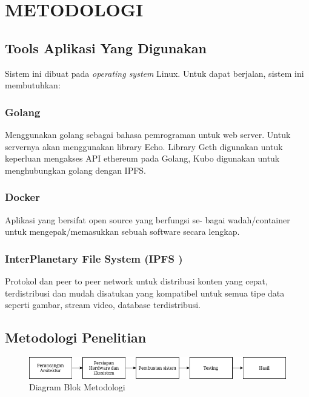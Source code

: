 \section{METODOLOGI}


\subsection{Tools Aplikasi Yang Digunakan}

Sistem ini dibuat pada \emph{operating system} Linux. Untuk dapat
berjalan, sistem ini membutuhkan:

\subsubsection{Golang}
Menggunakan golang sebagai bahasa pemrograman untuk web server. Untuk servernya akan menggunakan library Echo. Library Geth
digunakan untuk keperluan mengakses API ethereum pada Golang, Kubo digunakan untuk menghubungkan golang dengan IPFS.

\subsubsection{Docker}
Aplikasi yang bersifat open source yang berfungsi se-
bagai wadah/container untuk mengepak/memasukkan sebuah
software secara lengkap.

\subsubsection{InterPlanetary File System (IPFS )}
Protokol dan peer to
peer network untuk distribusi konten yang cepat, terdistribusi
dan mudah disatukan yang kompatibel untuk semua tipe data
seperti gambar, stream video, database terdistribusi.

\subsection{Metodologi Penelitian}

\begin{figure} [ht] \centering
  \includegraphics[scale=0.55]{gambar/diagram_blok_metodologi.png}
  \caption{Diagram Blok Metodologi}
  \label{fig:Blueprint}
\end{figure}

